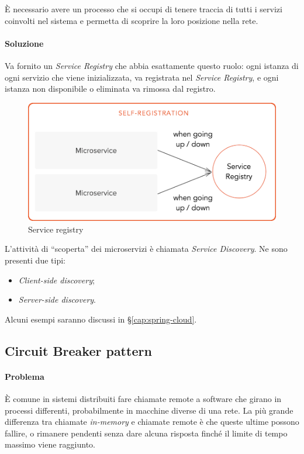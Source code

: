 È necessario avere un processo che si occupi di tenere traccia di tutti i servizi coinvolti nel sistema e permetta di scoprire la loro posizione nella rete.

\paragraph*{Soluzione} Va fornito un \textit{Service Registry} che abbia esattamente questo ruolo:
ogni istanza di ogni servizio che viene inizializzata, va registrata nel \textit{Service Registry}, e ogni istanza non disponibile o eliminata va rimossa dal registro.

\begin{figure}[H]
	\centering
	\includegraphics[width=\textwidth]{immagini/service-registry.png}
	\caption[Esempio di Saga pattern]{Service registry\footnotemark}
\end{figure}

L'attività di ``scoperta'' dei microservizi è chiamata \textit{Service Discovery}. Ne sono presenti due tipi:
\begin{itemize}
	\item \textit{Client-side discovery};
	\item \textit{Server-side discovery}.
\end{itemize}
Alcuni esempi saranno discussi in \S\ref{cap:spring-cloud}.


\subsection{Circuit Breaker pattern}\label{circuit-breaker}

\paragraph*{Problema} È comune in sistemi distribuiti fare chiamate remote a software che girano in processi differenti, probabilmente in macchine diverse di una rete.
La più grande differenza tra chiamate \textit{in-memory} e chiamate remote è che queste ultime possono fallire, o rimanere pendenti senza dare alcuna risposta finché il limite di tempo massimo viene raggiunto.

